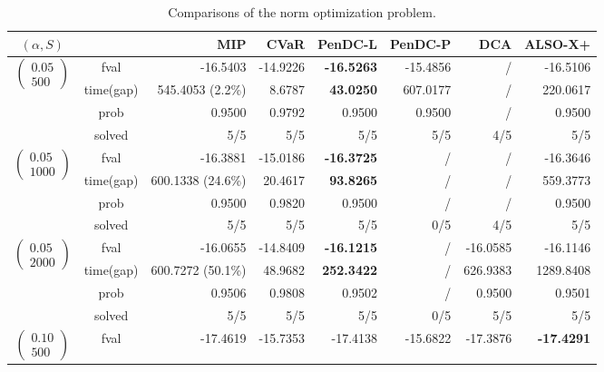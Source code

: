 \documentclass[11pt]{article}
\begin{document}
\begin{table}[ht!]
\centering
\caption{Comparisons of the norm optimization problem.}
\label{tab:nonlinear-avg}
\scriptsize
\setlength{\tabcolsep}{3pt}
\renewcommand{\arraystretch}{0.92}
\begin{tabular}{ccrrrrrr}
\toprule
$(\alpha,S)$ & & MIP & CVaR & PenDC-L & PenDC-P & DCA & ALSO-X+\\
\midrule
\multirow{4}{*}{$\left(\begin{array}{c} 0.05 \\ 500 \end{array}\right)$} & fval  & -16.5403 & -14.9226 & \textbf{-16.5263} & -15.4856 & / & -16.5106\\
& time(gap)  & 545.4053 (2.2\%) & 8.6787 & \textbf{43.0250} & 607.0177 & / & 220.0617\\
& prob  & 0.9500 & 0.9792 & 0.9500 & 0.9500 & / & 0.9500\\
& solved & 5/5 & 5/5 & 5/5 & 5/5 & 4/5 & 5/5\\
\midrule
\multirow{4}{*}{$\left(\begin{array}{c} 0.05 \\ 1000 \end{array}\right)$} & fval  & -16.3881 & -15.0186 & \textbf{-16.3725} & / & / & -16.3646\\
& time(gap)  & 600.1338 (24.6\%) & 20.4617 & \textbf{93.8265} & / & / & 559.3773\\
& prob  & 0.9500 & 0.9820 & 0.9500 & / & / & 0.9500\\
& solved & 5/5 & 5/5 & 5/5 & 0/5 & 4/5 & 5/5\\
\midrule
\multirow{4}{*}{$\left(\begin{array}{c} 0.05 \\ 2000 \end{array}\right)$} & fval  & -16.0655 & -14.8409 & \textbf{-16.1215} & / & -16.0585 & -16.1146\\
& time(gap)  & 600.7272 (50.1\%) & 48.9682 & \textbf{252.3422} & / & 626.9383 & 1289.8408\\
& prob  & 0.9506 & 0.9808 & 0.9502 & / & 0.9500 & 0.9501\\
& solved & 5/5 & 5/5 & 5/5 & 0/5 & 5/5 & 5/5\\
\midrule\midrule
\multirow{4}{*}{$\left(\begin{array}{c} 0.10 \\ 500 \end{array}\right)$} & fval  & -17.4619 & -15.7353 & -17.4138 & -15.6822 & -17.3876 & \textbf{-17.4291}\\

\end{tabular}
\end{table}
\end{document}
